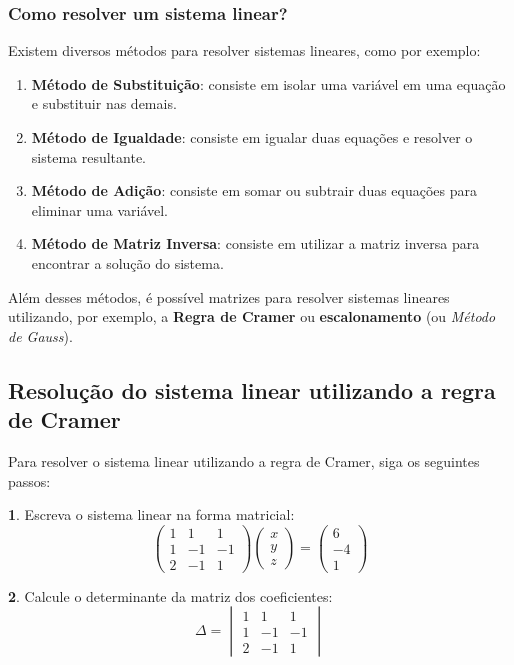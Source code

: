 \documentclass[12pt]{article}
\begin{document}
\subsubsection{Como resolver um sistema linear?}
Existem diversos métodos para resolver sistemas lineares, como por exemplo:
\begin{enumerate}
    \item \textbf{Método de Substituição}: consiste em isolar uma variável em uma equação e substituir nas demais.
    \item \textbf{Método de Igualdade}: consiste em igualar duas equações e resolver o sistema resultante.
    \item \textbf{Método de Adição}: consiste em somar ou subtrair duas equações para eliminar uma variável.
    \item \textbf{Método de Matriz Inversa}: consiste em utilizar a matriz inversa para encontrar a solução do sistema.
\end{enumerate}

Além desses métodos, é possível matrizes para resolver sistemas lineares utilizando, por exemplo, a \textbf{Regra de Cramer} ou \textbf{escalonamento} (ou \textit{Método de Gauss}).

\subsection{Resolução do sistema linear utilizando a regra de Cramer}
Para resolver o sistema linear utilizando a regra de Cramer, siga os seguintes passos:

\textbf{1}. Escreva o sistema linear na forma matricial:
\[
\begin{pmatrix}
    1  &  1  &  1 \\
    1  & -1  & -1 \\
    2  & -1  &  1
\end{pmatrix}
\begin{pmatrix}
x \\
y \\
z
\end{pmatrix}
=
\begin{pmatrix}
 6 \\
-4 \\
 1
\end{pmatrix}
\]

\textbf{2}. Calcule o determinante da matriz dos coeficientes:
\[
\Delta = \begin{vmatrix}
    1  &  1  &  1 \\
    1  & -1  & -1 \\
    2  & -1  &  1
\end{vmatrix}
\]
\end{document}

